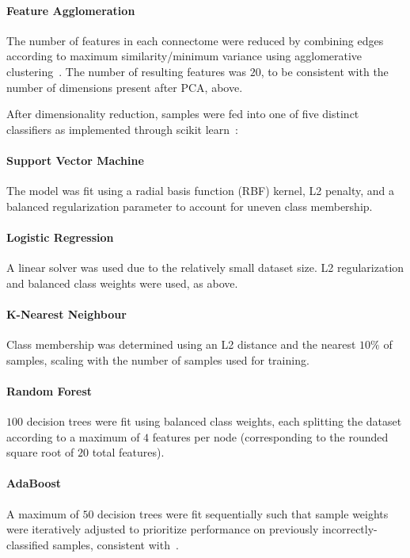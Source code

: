 \documentclass[10pt]{SelfArx} %
\begin{document}
\paragraph{Feature Agglomeration} The number of features in each connectome were reduced by combining edges according
to maximum similarity/minimum variance using agglomerative clustering~\cite{Ward1963-uh}. The number of resulting
features was $20$, to be consistent with the number of dimensions present after PCA, above.

After dimensionality reduction, samples were fed into one of five distinct classifiers as implemented through scikit
learn~\cite{Pedregosa2011-uz}:

\paragraph{Support Vector Machine} The model was fit using a radial basis function (RBF) kernel, L2 penalty, and a
balanced regularization parameter to account for uneven class membership.

\paragraph{Logistic Regression} A linear solver was used due to the relatively small dataset size. L2 regularization
and balanced class weights were used, as above.

\paragraph{K-Nearest Neighbour} Class membership was determined using an L2 distance and the nearest $10\%$ of
samples, scaling with the number of samples used for training.

\paragraph{Random Forest} $100$ decision trees were fit using balanced class weights, each splitting the dataset
according to a maximum of $4$ features per node (corresponding to the rounded square root of $20$ total features).

\paragraph{AdaBoost} A maximum of $50$ decision trees were fit sequentially such that sample weights were iteratively
adjusted to prioritize performance on previously incorrectly-classified samples, consistent with~\cite{Freund1997-qy}.
\end{document}
